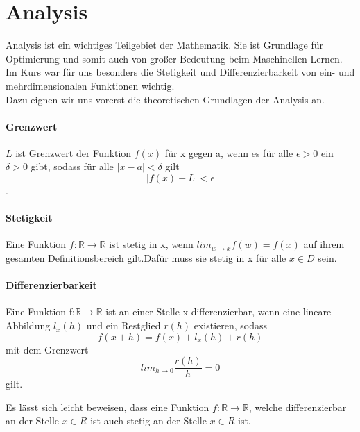 \section{Analysis}
  

Analysis ist ein wichtiges Teilgebiet der Mathematik. Sie ist Grundlage für Optimierung und somit auch von großer Bedeutung beim Maschinellen Lernen. \\
Im Kurs war für uns besonders die Stetigkeit und Differenzierbarkeit von ein- und mehrdimensionalen Funktionen wichtig. \\
Dazu eignen wir uns vorerst die theoretischen Grundlagen der Analysis an. \\

\paragraph{Grenzwert}
$L$ ist Grenzwert der Funktion $f(x)$ für x gegen a, wenn es für alle $\epsilon > 0$ ein $\delta > 0$ gibt, sodass für alle $|x-a| < \delta$ gilt \begin{equation*}|f(x)-L|<\epsilon\end{equation*}.

\paragraph{Stetigkeit}
Eine Funktion $f:\mathds{R}\rightarrow \mathds{R}$ ist stetig in x, wenn $lim_{w\rightarrow x}f(w)=f(x)$ auf ihrem gesamten Definitionsbereich gilt.Dafür muss sie stetig in x für alle $x\in D$ sein.

\paragraph{Differenzierbarkeit}
Eine Funktion f:$\mathds{R}\rightarrow\mathds{R}$ ist an einer Stelle x differenzierbar, wenn eine lineare Abbildung $ l_ x (h)$ und ein Restglied $r(h)$ existieren, sodass \begin{equation*}f(x+h)=f(x)+l_{x}(h)+r(h)\end{equation*} mit dem Grenzwert \begin{equation*}lim_{h\rightarrow 0} \frac{r(h)}{h}= 0\end{equation*}gilt.

Es lässt sich leicht beweisen, dass eine Funktion $f:\mathds{R} \rightarrow \mathds{R}$, welche differenzierbar an der Stelle $x \in R$ ist auch stetig an der Stelle $x \in R$ ist.\\ %

